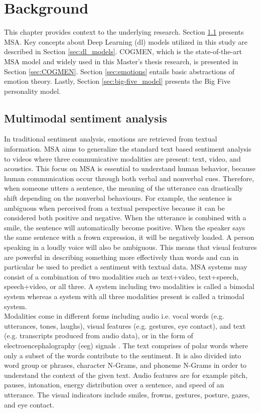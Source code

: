 \chapter{Background}
\label{chap:background}
This chapter provides context to the underlying research. Section \ref{sec:msa_intro} presents MSA. Key concepts about Deep Learning (\acrshort{dl}) models utilized in this study are described in Section \ref{sec:dl_models}. COGMEN, which is the state-of-the-art MSA model and widely used in this Master's thesis research, is presented in Section \ref{sec:COGMEN}. Section \ref{sec:emotions} entails basic abstractions of emotion theory. Lastly, Section \ref{sec:big-five_model} presents the Big Five personality model. 

\section{Multimodal sentiment analysis}
\label{sec:msa_intro}
In traditional sentiment analysis, emotions are retrieved from textual information. MSA aims to generalize the standard text based sentiment analysis to videos where three communicative modalities are present: text, video, and acoustics. This focus on MSA is essential to understand human behavior, because human communication occur through both verbal and nonverbal cues. Therefore, when someone utters a sentence, the meaning of the utterance can drastically shift depending on the nonverbal behaviours. For example, the sentence  is ambiguous when perceived from a textual perspective because it can be considered both positive and negative. When the utterance is combined with a smile, the sentence will automatically become positive. When the speaker says the same sentence with a frown expression, it will be negatively loaded. A person speaking  in a loudly voice will also be ambiguous. This means that visual features are powerful in describing something more effectively than words and can in particular be used to predict a sentiment with textual data. MSA systems may consist of a combination of two modalities such as text+video, text+speech, speech+video, or all three. A system including two modalities is called a bimodal system whereas a system with all three modalities present is called a trimodal system. \\

Modalities come in different forms including audio i.e. vocal words (e.g. utterances, tones, laughs), visual features (e.g. gestures, eye contact), and text (e.g. transcripts produced from audio data), or in the form of electroencephalography (\acrshort{eeg}) signals \cite{MSA-review-3-9686504}. The text comprises of polar words where only a subset of the words contribute to the sentiment. It is also divided into word group or phrases, character N-Grams, and phoneme N-Grams in order to understand the context of the given text. Audio features are for example pitch, pauses, intonation, energy distribution over a sentence, and speed of an utterance. The visual indicators include smiles, frowns, gestures, posture, gazes, and eye contact. \\

